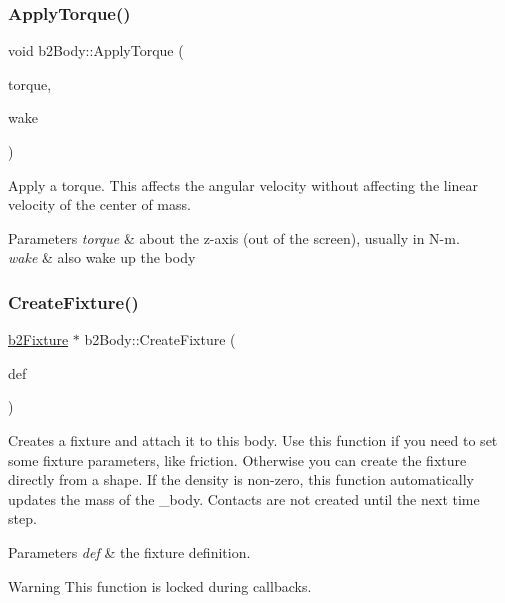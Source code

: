 \subsubsection{\texorpdfstring{Apply\+Torque()}{ApplyTorque()}}
{\footnotesize\ttfamily void b2\+Body\+::\+Apply\+Torque (\begin{DoxyParamCaption}\item[{float32}]{torque,  }\item[{bool}]{wake }\end{DoxyParamCaption})\hspace{0.3cm}{\ttfamily [inline]}}

Apply a torque. This affects the angular velocity without affecting the linear velocity of the center of mass. 
\begin{DoxyParams}{Parameters}
{\em torque} & about the z-\/axis (out of the screen), usually in N-\/m. \\
\hline
{\em wake} & also wake up the body \\
\hline
\end{DoxyParams}
\mbox{\label{classb2Body_aa4892301e9b9d62ede5e93dad1743894}} 
\subsubsection{\texorpdfstring{Create\+Fixture()}{CreateFixture()}\hspace{0.1cm}{\footnotesize\ttfamily [1/2]}}
{\footnotesize\ttfamily \mbox{\hyperlink{classb2Fixture}{b2\+Fixture}} $\ast$ b2\+Body\+::\+Create\+Fixture (\begin{DoxyParamCaption}\item[{const \mbox{\hyperlink{structb2FixtureDef}{b2\+Fixture\+Def}} $\ast$}]{def }\end{DoxyParamCaption})}

Creates a fixture and attach it to this body. Use this function if you need to set some fixture parameters, like friction. Otherwise you can create the fixture directly from a shape. If the density is non-\/zero, this function automatically updates the mass of the _body. Contacts are not created until the next time step.
\begin{DoxyParams}{Parameters}
{\em def} & the fixture definition. \\
\hline
\end{DoxyParams}
\begin{DoxyWarning}{Warning}
This function is locked during callbacks. 
\end{DoxyWarning}
\mbox{\label{classb2Body_a52d971867086d5db79769a62bbb70a60}} 
